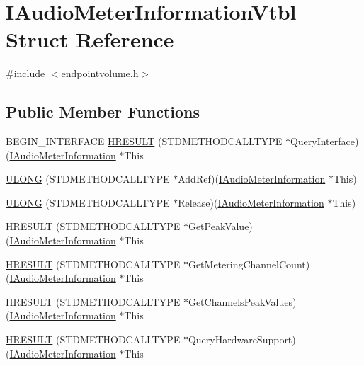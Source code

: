 \hypertarget{struct_i_audio_meter_information_vtbl}{}\section{I\+Audio\+Meter\+Information\+Vtbl Struct Reference}
\label{struct_i_audio_meter_information_vtbl}


{\ttfamily \#include $<$endpointvolume.\+h$>$}

\subsection*{Public Member Functions}
\begin{DoxyCompactItemize}
\item 
B\+E\+G\+I\+N\+\_\+\+I\+N\+T\+E\+R\+F\+A\+CE \hyperlink{struct_i_audio_meter_information_vtbl_af6bd08daeea2822f9067333b475dad4d}{H\+R\+E\+S\+U\+LT} (S\+T\+D\+M\+E\+T\+H\+O\+D\+C\+A\+L\+L\+T\+Y\+PE $\ast$Query\+Interface)(\hyperlink{endpointvolume_8h_a48abfa438ed63b7947db8cb1be5cc177}{I\+Audio\+Meter\+Information} $\ast$This
\item 
\hyperlink{struct_i_audio_meter_information_vtbl_a3a40fb27152373b647aced0cf237918a}{U\+L\+O\+NG} (S\+T\+D\+M\+E\+T\+H\+O\+D\+C\+A\+L\+L\+T\+Y\+PE $\ast$Add\+Ref)(\hyperlink{endpointvolume_8h_a48abfa438ed63b7947db8cb1be5cc177}{I\+Audio\+Meter\+Information} $\ast$This)
\item 
\hyperlink{struct_i_audio_meter_information_vtbl_a5be3823513392bc15657a498163a50a9}{U\+L\+O\+NG} (S\+T\+D\+M\+E\+T\+H\+O\+D\+C\+A\+L\+L\+T\+Y\+PE $\ast$Release)(\hyperlink{endpointvolume_8h_a48abfa438ed63b7947db8cb1be5cc177}{I\+Audio\+Meter\+Information} $\ast$This)
\item 
\hyperlink{struct_i_audio_meter_information_vtbl_aab1be13ee1c495e52b33fe90d7124409}{H\+R\+E\+S\+U\+LT} (S\+T\+D\+M\+E\+T\+H\+O\+D\+C\+A\+L\+L\+T\+Y\+PE $\ast$Get\+Peak\+Value)(\hyperlink{endpointvolume_8h_a48abfa438ed63b7947db8cb1be5cc177}{I\+Audio\+Meter\+Information} $\ast$This
\item 
\hyperlink{struct_i_audio_meter_information_vtbl_a4803cc0790473ce844e1d3767dc6967b}{H\+R\+E\+S\+U\+LT} (S\+T\+D\+M\+E\+T\+H\+O\+D\+C\+A\+L\+L\+T\+Y\+PE $\ast$Get\+Metering\+Channel\+Count)(\hyperlink{endpointvolume_8h_a48abfa438ed63b7947db8cb1be5cc177}{I\+Audio\+Meter\+Information} $\ast$This
\item 
\hyperlink{struct_i_audio_meter_information_vtbl_a7bdf97c61eab3281bfcf0835da8bf663}{H\+R\+E\+S\+U\+LT} (S\+T\+D\+M\+E\+T\+H\+O\+D\+C\+A\+L\+L\+T\+Y\+PE $\ast$Get\+Channels\+Peak\+Values)(\hyperlink{endpointvolume_8h_a48abfa438ed63b7947db8cb1be5cc177}{I\+Audio\+Meter\+Information} $\ast$This
\item 
\hyperlink{struct_i_audio_meter_information_vtbl_ac51b74c5bf768ca42bd8cf2e2b33d8b4}{H\+R\+E\+S\+U\+LT} (S\+T\+D\+M\+E\+T\+H\+O\+D\+C\+A\+L\+L\+T\+Y\+PE $\ast$Query\+Hardware\+Support)(\hyperlink{endpointvolume_8h_a48abfa438ed63b7947db8cb1be5cc177}{I\+Audio\+Meter\+Information} $\ast$This
\end{DoxyCompactItemize}
